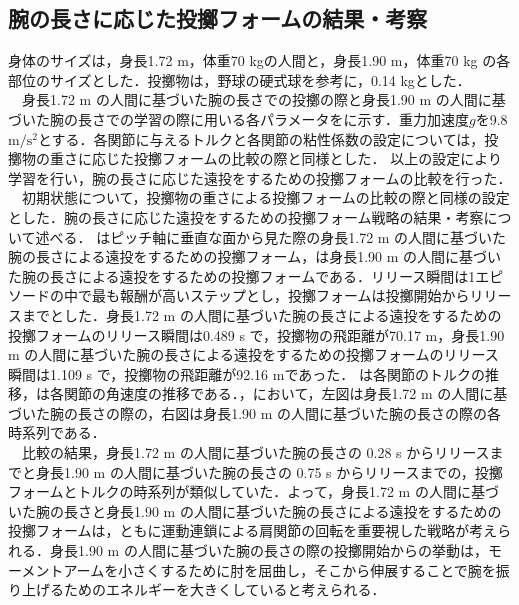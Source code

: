 \subsection{腕の長さに応じた投擲フォームの結果・考察}
身体のサイズは，身長1.72 m，体重70 kgの人間と，身長1.90 m，体重70 kg の各部位のサイズとした．投擲物は，野球の硬式球を参考に，0.14 kgとした．\\
　身長1.72 m の人間に基づいた腕の長さでの投擲の際と身長1.90 m の人間に基づいた腕の長さでの学習の際に用いる各パラメータをに示す．重力加速度$g$を9.8 $\mathrm{m/s^{2}}$とする．各関節に与えるトルクと各関節の粘性係数の設定については，投擲物の重さに応じた投擲フォームの比較の際と同様とした．
以上の設定により学習を行い，腕の長さに応じた遠投をするための投擲フォームの比較を行った．\\
　初期状態について，投擲物の重さによる投擲フォームの比較の際と同様の設定とした．腕の長さに応じた遠投をするための投擲フォーム戦略の結果・考察について述べる．
はピッチ軸に垂直な面から見た際の身長1.72 m の人間に基づいた腕の長さによる遠投をするための投擲フォーム，は身長1.90 m の人間に基づいた腕の長さによる遠投をするための投擲フォームである．リリース瞬間は1エピソードの中で最も報酬が高いステップとし，投擲フォームは投擲開始からリリースまでとした．身長1.72 m の人間に基づいた腕の長さによる遠投をするための投擲フォームのリリース瞬間は0.489 s で，投擲物の飛距離が70.17 m，身長1.90 m の人間に基づいた腕の長さによる遠投をするための投擲フォームのリリース瞬間は1.109 s で，投擲物の飛距離が92.16 mであった．
は各関節のトルクの推移，は各関節の角速度の推移である．，において，左図は身長1.72 m の人間に基づいた腕の長さの際の，右図は身長1.90 m の人間に基づいた腕の長さの際の各時系列である．\\
　比較の結果，身長1.72 m の人間に基づいた腕の長さの 0.28 s からリリースまでと身長1.90 m の人間に基づいた腕の長さの 0.75 s からリリースまでの，投擲フォームとトルクの時系列が類似していた．よって，身長1.72 m の人間に基づいた腕の長さと身長1.90 m の人間に基づいた腕の長さによる遠投をするための投擲フォームは，ともに運動連鎖による肩関節の回転を重要視した戦略が考えられる．身長1.90 m の人間に基づいた腕の長さの際の投擲開始からの挙動は，モーメントアームを小さくするために肘を屈曲し，そこから伸展することで腕を振り上げるためのエネルギーを大きくしていると考えられる．
